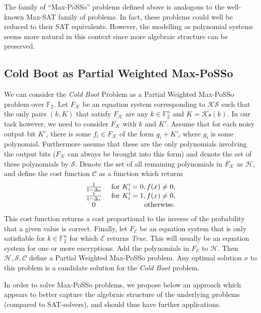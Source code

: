 \documentclass{llncs}
\newcommand{\Ss}{\ensuremath{\mathcal{S}}}
\newcommand{\Hs}{\ensuremath{\mathcal{H}}}
\newcommand{\coldboot}{\emph{Cold Boot}\xspace}
\newcommand{\field}[1]{\mathbb{#1}}
\newcommand{\F}{\field{F}}
\begin{document}
The family of ``Max-PoSSo'' problems defined above is analogous to the well-known Max-SAT family of problems. In fact, these problems could well be reduced to their SAT equivalents. 
However, the modelling as polynomial systems seems more natural in this context since more algebraic structure can be preserved.

\subsection{Cold Boot as Partial Weighted Max-PoSSo}

We can consider the \coldboot Problem as a Partial Weighted Max-PoSSo problem over $\field{F}_2$.
Let $F_\mathcal{K}$ be an equation system corresponding to $\mathcal{KS}$ such that the only pairs $(k,K)$ that satisfy $F_\mathcal{K}$ are any $k \in \F_2^n$ and $K = \mathcal{Ks}(k)$. In our task however, 
we need to consider $F_\mathcal{K}$ with $k$ and $K'$. Assume that for each noisy output bit $K'_i$ there is some $f_i \in F_\mathcal{K}$ of the form $g_i + K'_i$ where $g_i$ is some polynomial. Furthermore assume that these are the only polynomials involving the output bits  ($F_\mathcal{K}$ can always be brought into this form) and denote the set of these polynomials by $\Ss$. Denote the set of all remaining polynomials in $F_\mathcal{K}$ as $\Hs$, and define the cost function $\mathcal{C}$ as a function which returns 
\[
\begin{array}{cr} \frac{1}{1 - \Delta_0} &\textnormal{ for } K'_i = 0, f(x) \neq 0,\\
\frac{1}{1 - \Delta_1} & \textnormal{ for } K'_i=1, f(x) \neq 0,\\
0 & \textnormal{otherwise}.\end{array}
\]
This cost function returns a cost proportional to the inverse of the probability that a given value is correct.
Finally, let $F_\mathcal{E}$ be an equation system that is only satisfiable for $k \in \F_2^n$ for which $\mathcal{E}$ returns \emph{True}. This will usually be an equation system for one or more encryptions. Add the polynomials in $F_\mathcal{E}$ to $\Hs$. Then $\Hs,\Ss,\mathcal{C}$ define a Partial Weighted Max-PoSSo problem. Any optimal solution $x$ to this problem is a candidate solution for the \coldboot problem.

In order to solve Max-PoSSo problems, we propose below an approach which appears to better capture the algebraic structure of the underlying problems (compared to SAT-solvers), and should thus have further applications.
\end{document}
